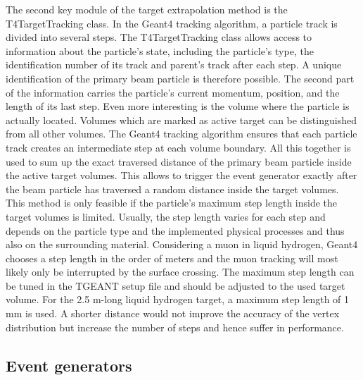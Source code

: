 The second key module of the target extrapolation method is the T4TargetTracking class. In the Geant4 tracking algorithm, a particle track is divided into several steps. The T4TargetTracking class allows access to information about the particle’s state, including the particle’s type, the identification number of its track and parent’s track after each step. A unique identification of the primary beam particle is therefore possible. The second part of the information carries the particle’s current momentum, position, and the length of its last step. Even more interesting is the volume where the particle is actually located. Volumes which are marked as active target can be distinguished from all other volumes. The Geant4 tracking algorithm ensures that each particle track creates an intermediate step at each volume boundary. All this together is used to sum up the exact traversed distance of the primary beam particle inside the active target volumes. This allows to trigger the event generator exactly after the beam particle has traversed a random distance inside the target volumes. This method is only feasible if the particle’s maximum step length inside the target volumes is limited. Usually, the step length varies for each step and depends on the particle type and the implemented physical processes and thus also on the surrounding material. Considering a muon in liquid hydrogen, Geant4 chooses a step length in the order of meters and the muon tracking will most likely only be interrupted by the surface crossing. The maximum step length can be tuned in the TGEANT setup file and should be adjusted to the used target volume. For the 2.5 m-long liquid hydrogen target, a maximum step length of 1 mm is used. A shorter distance would not improve the accuracy of the vertex distribution but increase the number of steps and hence suffer in performance.

\subsection{Event generators}

